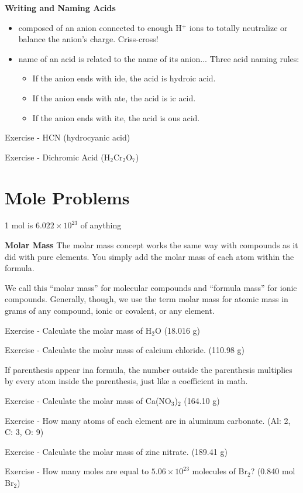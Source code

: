 \documentclass[../hchem.tex]{subfiles}
\begin{document}
\textbf{Writing and Naming Acids}
\begin{itemize}
    \item composed of an anion connected to enough H$^+$ ions to totally neutralize or balance the anion's charge. Criss-cross! 
    \item name of an acid is related to the name of its anion... 
    Three acid naming rules:
    \begin{itemize}
        \item If the anion ends with ide, the acid is hydro\blank ic acid.
        \item If the anion ends with ate, the acid is \blank ic acid.
        \item If the anion ends with ite, the acid is \blank ous acid.
    \end{itemize}
\end{itemize}

Exercise - HCN (hydrocyanic acid)

Exercise - Dichromic Acid (H$_2$Cr$_2$O$_7$)

\section{Mole Problems}
1 mol is $6.022\times 10^{23}$ of anything

\textbf{Molar Mass}
The molar mass concept works the same way with compounds as it did with pure elements.
You simply add the molar mass of each atom within the formula.

We call this ``molar mass'' for molecular compounds and ``formula mass'' for ionic compounds.
Generally, though, we use the term molar mass for atomic mass in grams of any compound, ionic or covalent, or any element.

Exercise - Calculate the molar mass of H$_2$O (18.016 g)

Exercise - Calculate the molar mass of calcium chloride. (110.98 g)

If parenthesis appear ina  formula, the number outside the parenthesis multiplies by every 
atom inside the parenthesis, just like a coefficient in math.

Exercise - Calculate the molar mass of Ca(NO$_3$)$_2$ (164.10 g)

Exercise - How many atoms of each element are in aluminum carbonate. (Al: 2, C: 3, O: 9)

Exercise - Calculate the molar mass of zinc nitrate. (189.41 g)

Exercise - How many moles are equal to $5.06\times 10^{23}$ molecules of Br$_2$? (0.840 mol Br$_2$)
\end{document}
